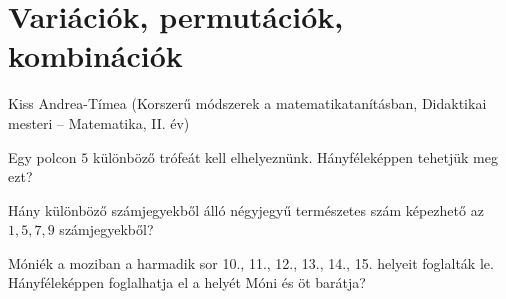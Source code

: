 
\chapter{Variációk, permutációk, kombinációk}\label{chap:perm}
\begin{description}
	{\large \item [{Szerző:}] Kiss Andrea-Tímea (Korszerű módszerek a matematikatanításban, Didaktikai mesteri -- Matematika, 
		II. év)}
	
\end{description}
\begin{problem}
\label{fel1} Egy polcon $5$ különböző trófeát kell elhelyeznünk.
Hányféleképpen tehetjük meg ezt? 
\end{problem}

\begin{problem}
\label{fel2} Hány különböző számjegyekből álló négyjegyű természetes
szám képezhető az $1,5,7,9$ számjegyekből? 
\end{problem}

\begin{problem}
\label{fel3} Móniék a moziban a harmadik sor 10., 11., 12., 13.,
14., 15. helyeit foglalták le. Hányféleképpen foglalhatja el a helyét
Móni és öt barátja? 
\end{problem}

